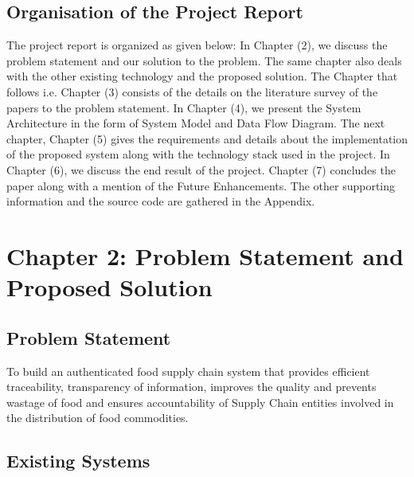 \documentclass[12pt,a4paper,twocolumn,fleqn]{article}
\begin{document}
\subsection{Organisation of the Project Report}
The project report is organized as given below: In Chapter (2), we discuss the problem statement and our solution to the problem. The same chapter also deals with the other existing technology and the proposed solution. The Chapter that follows i.e. Chapter (3) consists of the details on the literature survey of the papers to the problem statement. In Chapter (4), we present the System Architecture in the form of System Model and Data Flow Diagram. The next chapter, Chapter (5) gives the requirements and details about the implementation of the proposed system along with the technology stack used in the project. In Chapter (6), we discuss the end result of the project. Chapter (7) concludes the paper along with a mention of the Future Enhancements. The other supporting information and the source code are gathered in the Appendix. 
\newpage
  \pagestyle{fancy}
  \thispagestyle{empty}
  \thispagestyle{plain}
  \fancyhf{}
  \chead{}
  \renewcommand{\headrulewidth}{0.4pt}%
\renewcommand{\footrulewidth}{0.4pt}%
\normalsize
\section{Chapter 2: Problem Statement and Proposed Solution}
\subsection{Problem Statement}
To build an authenticated food supply chain system that provides efficient traceability, transparency of information, improves the quality and prevents wastage of food and ensures accountability of Supply Chain entities involved in the distribution of food commodities. \\
\subsection{Existing Systems}
\end{document}
